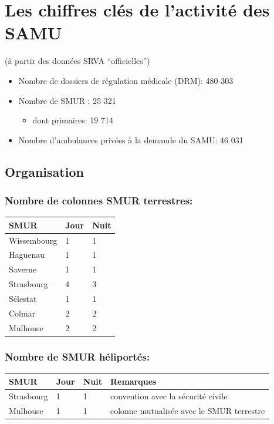 \documentclass[]{article}
\begin{document}
\section{Les chiffres clés de l'activité des
SAMU}\label{les-chiffres-cles-de-lactivite-des-samu}

(à partir des données SRVA ``officielles'')

\begin{itemize}
\itemsep1pt\parskip0pt
\item
  Nombre de dossiers de régulation médicale (DRM): 480 303
\item
  Nombre de SMUR : 25 321

  \begin{itemize}
  \itemsep1pt\parskip0pt
  \item
    dont primaires: 19 714
  \end{itemize}
\item
  Nombre d'ambulances privées à la demande du SAMU: 46 031
\end{itemize}

\subsection{Organisation}\label{organisation}

\subsubsection{Nombre de colonnes SMUR
terrestres:}\label{nombre-de-colonnes-smur-terrestres}

\begin{longtable}[c]{@{}lll@{}}
\toprule
SMUR & Jour & Nuit\tabularnewline
\midrule
\endhead
Wissembourg & 1 & 1\tabularnewline
Haguenau & 1 & 1\tabularnewline
Saverne & 1 & 1\tabularnewline
Strasbourg & 4 & 3\tabularnewline
Sélestat & 1 & 1\tabularnewline
Colmar & 2 & 2\tabularnewline
Mulhouse & 2 & 2\tabularnewline
\bottomrule
\end{longtable}

\subsubsection{Nombre de SMUR
héliportés:}\label{nombre-de-smur-heliportes}

\begin{longtable}[c]{@{}llll@{}}
\toprule
SMUR & Jour & Nuit & Remarques\tabularnewline
\midrule
\endhead
Strasbourg & 1 & 1 & convention avec la sécurité civile\tabularnewline
Mulhouse & 1 & 1 & colonne mutualisée avec le SMUR
terrestre\tabularnewline
\bottomrule
\end{longtable}
\end{document}
